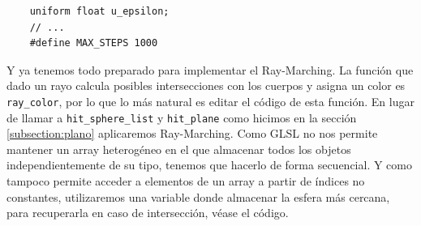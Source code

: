 \begin{lstlisting}
    uniform float u_epsilon;
    // ... 
    #define MAX_STEPS 1000
\end{lstlisting}

Y ya tenemos todo preparado para implementar el Ray-Marching. La función que dado un rayo calcula posibles intersecciones con los cuerpos y asigna un color es \verb|ray_color|, por lo que lo más natural es editar el código de esta función. En lugar de llamar a \verb|hit_sphere_list| y \verb|hit_plane| como hicimos en la sección \ref{subsection:plano} aplicaremos Ray-Marching. Como GLSL no nos permite mantener un array heterogéneo en el que almacenar todos los objetos independientemente de su tipo, tenemos que hacerlo de forma secuencial. Y como tampoco permite acceder a elementos de un array a partir de índices no constantes, utilizaremos una variable donde almacenar la esfera más cercana, para recuperarla en caso de intersección, véase el código.

